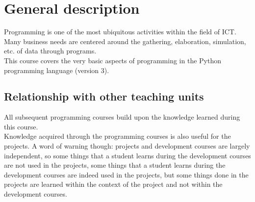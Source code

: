 \section{General description}
		Programming is one of the most ubiquitous activities within the field of ICT. Many business needs are centered around the gathering, elaboration, simulation, etc. of data through programs. \\
		
		This course covers the very basic aspects of programming in the Python programming language (version 3). \\

	\subsection{Relationship with other teaching units}
		All subsequent programming courses build upon the knowledge learned during this course.	\\
		
		Knowledge acquired through the programming courses is also useful for the projects. A word of warning though: projects and development courses are largely independent, so some things that a student learns during the development courses are not used in the projects, some things that a student learns during the development courses are indeed used in the projects, but some things done in the projects are learned within the context of the project and not within the development courses.
